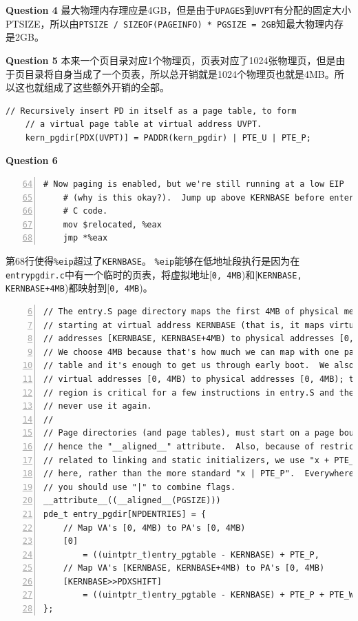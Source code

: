\documentclass[11pt]{article}
\begin{document}
\noindent\textbf{Question 4}
最大物理内存理应是4GB，但是由于\lstinline|UPAGES|到\lstinline|UVPT|有分配的固定大小PTSIZE，所以由\lstinline|PTSIZE / SIZEOF(PAGEINFO) * PGSIZE = 2GB|知最大物理内存是2GB。

\noindent\textbf{Question 5}
本来一个页目录对应1个物理页，页表对应了1024张物理页，但是由于页目录将自身当成了一个页表，所以总开销就是1024个物理页也就是4MB。所以这也就组成了这些额外开销的全部。

\begin{lstlisting}[title=kern/pmap.c]
    // Recursively insert PD in itself as a page table, to form
    // a virtual page table at virtual address UVPT.
    kern_pgdir[PDX(UVPT)] = PADDR(kern_pgdir) | PTE_U | PTE_P;
\end{lstlisting}

\noindent\textbf{Question 6}

\begin{lstlisting}[title=kern/entry.S,numbers=left,firstnumber=64]
	# Now paging is enabled, but we're still running at a low EIP
	# (why is this okay?).  Jump up above KERNBASE before entering
	# C code.
	mov	$relocated, %eax
	jmp	*%eax
\end{lstlisting}
第68行使得\lstinline|%eip|超过了\lstinline|KERNBASE|。
\lstinline|%eip|能够在低地址段执行是因为在\lstinline|entrypgdir.c|中有一个临时的页表，将虚拟地址[\lstinline|0, 4MB|)和[\lstinline|KERNBASE, KERNBASE+4MB|)都映射到[\lstinline|0, 4MB|)。

\begin{lstlisting}[title=kern/entrypgdir.c,numbers=left,firstnumber=6]
// The entry.S page directory maps the first 4MB of physical memory
// starting at virtual address KERNBASE (that is, it maps virtual
// addresses [KERNBASE, KERNBASE+4MB) to physical addresses [0, 4MB)).
// We choose 4MB because that's how much we can map with one page
// table and it's enough to get us through early boot.  We also map
// virtual addresses [0, 4MB) to physical addresses [0, 4MB); this
// region is critical for a few instructions in entry.S and then we
// never use it again.
//
// Page directories (and page tables), must start on a page boundary,
// hence the "__aligned__" attribute.  Also, because of restrictions
// related to linking and static initializers, we use "x + PTE_P"
// here, rather than the more standard "x | PTE_P".  Everywhere else
// you should use "|" to combine flags.
__attribute__((__aligned__(PGSIZE)))
pde_t entry_pgdir[NPDENTRIES] = {
	// Map VA's [0, 4MB) to PA's [0, 4MB)
	[0]
		= ((uintptr_t)entry_pgtable - KERNBASE) + PTE_P,
	// Map VA's [KERNBASE, KERNBASE+4MB) to PA's [0, 4MB)
	[KERNBASE>>PDXSHIFT]
		= ((uintptr_t)entry_pgtable - KERNBASE) + PTE_P + PTE_W
};
\end{lstlisting}
\end{document}
